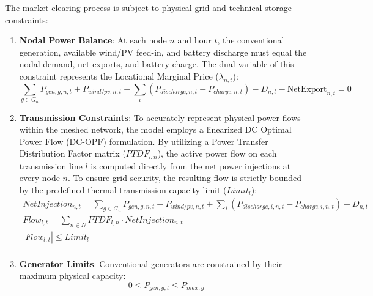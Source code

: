The market clearing process is subject to physical grid and technical storage constraints:
\begin{enumerate}
    \item \textbf{Nodal Power Balance}: At each node \(n\) and hour \(t\), the conventional generation, available wind/PV feed-in, and battery discharge must equal the nodal demand, net exports, and battery charge. The dual variable of this constraint represents the Locational Marginal Price (\(\lambda_{n,t}\)):
    \begin{equation}
        \sum_{g \in G_n} P_{gen,g,n,t} + P_{wind/pv,n,t} + \sum_{i} (P_{discharge, n, t} - P_{charge, n, t}) - D_{n, t} - \text{NetExport}_{n, t} = 0
    \end{equation}

    \item \textbf{Transmission Constraints}: To accurately represent physical power flows within the meshed network, the model employs a linearized DC Optimal Power Flow (DC-OPF) formulation. By utilizing a Power Transfer Distribution Factor matrix (\(PTDF_{l,n}\)), the active power flow on each transmission line \(l\) is computed directly from the net power injections at every node \(n\). To ensure grid security, the resulting flow is strictly bounded by the predefined thermal transmission capacity limit (\(Limit_{l}\)):
    \begin{equation}
        \begin{split}
            NetInjection_{n, t} = \sum_{g \in G_n} P_{gen, g, n, t} + P_{wind/pv, n, t} + \sum_{i} (P_{discharge, i, n, t} - P_{charge, i, n, t}) - D_{n, t} \\
            Flow_{l, t} = \sum_{n \in N} PTDF_{l, n} \cdot NetInjection_{n, t} \\
            |Flow_{l, t}| \le Limit_l \\
        \end{split}
    \end{equation}

    \item \textbf{Generator Limits}: Conventional generators are constrained by their maximum physical capacity: 
    \begin{equation}
        0 \le P_{gen, g, t} \le P_{max, g}
    \end{equation}


\end{enumerate}
